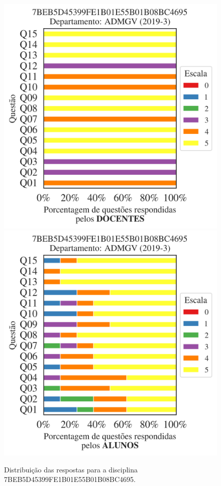 \documentclass[a4paper,10pt]{article}
\begin{document}
\begin{figure}[h]
\centering
\includegraphics[width=0.485\linewidth]{analise_disciplina_departamento_ADMGV_7BEB5D45399FE1B01E55B01B08BC4695_docentes.png}
\includegraphics[width=0.485\linewidth]{analise_disciplina_departamento_ADMGV_7BEB5D45399FE1B01E55B01B08BC4695_alunos.png}
\caption{\label{fig:analise_geral_departamento}                Distribuição das respostas para a disciplina 7BEB5D45399FE1B01E55B01B08BC4695. }
\end{figure}
\end{document}
